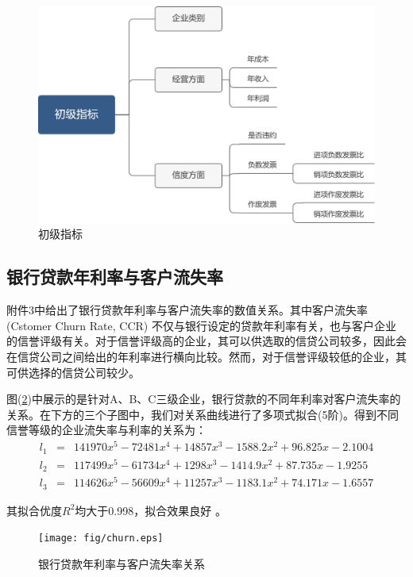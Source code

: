 \documentclass[withoutpreface,bwprint]{cumcmthesis} %
\begin{document}
\begin{figure}[h]	
	\centering
	\includegraphics[width=0.7\linewidth]{fig/primary}
	\caption{初级指标}
	\label{fig:primary}
\end{figure}


\subsection{银行贷款年利率与客户流失率}\label{sec:this}
附件3中给出了银行贷款年利率与客户流失率的数值关系。其中客户流失率(Cstomer Churn Rate, CCR) \cite{Huang2018Application,张卫2018关于顾客流失率的研究} 不仅与银行设定的贷款年利率有关，也与客户企业的信誉评级有关。对于信誉评级高的企业，其可以供选取的信贷公司较多，因此会在信贷公司之间给出的年利率进行横向比较。然而，对于信誉评级较低的企业，其可供选择的信贷公司较少。

图(\ref{fig:churn})中展示的是针对A、B、C三级企业，银行贷款的不同年利率对客户流失率的关系。在下方的三个子图中，我们对关系曲线进行了多项式拟合(5阶)。得到不同信誉等级的企业流失率与利率的关系为：
\begin{equation}
\begin{array}{rcl}
l_1&=&141970x^5-72481x^4+14857x^3-1588.2x^2+96.825x-2.1004\\
l_2&=&117499x^5 - 61734x^4 + 1298x^3 - 1414.9x^2 + 87.735x - 1.9255\\
l_3&=&114626x^5 - 56609x^4 + 11257x^3 - 1183.1x^2 + 74.171x - 1.6557
\end{array}
\end{equation}

其拟合优度$R^2$均大于0.998，拟合效果良好 \cite{程维虎2000拟合优度检验的回归分析方法及其应用}。

\begin{figure}[h]	
	\centering
	\texttt{[image: fig/churn.eps]}
	\caption{银行贷款年利率与客户流失率关系}
	\label{fig:churn}
\end{figure}
\end{document}
